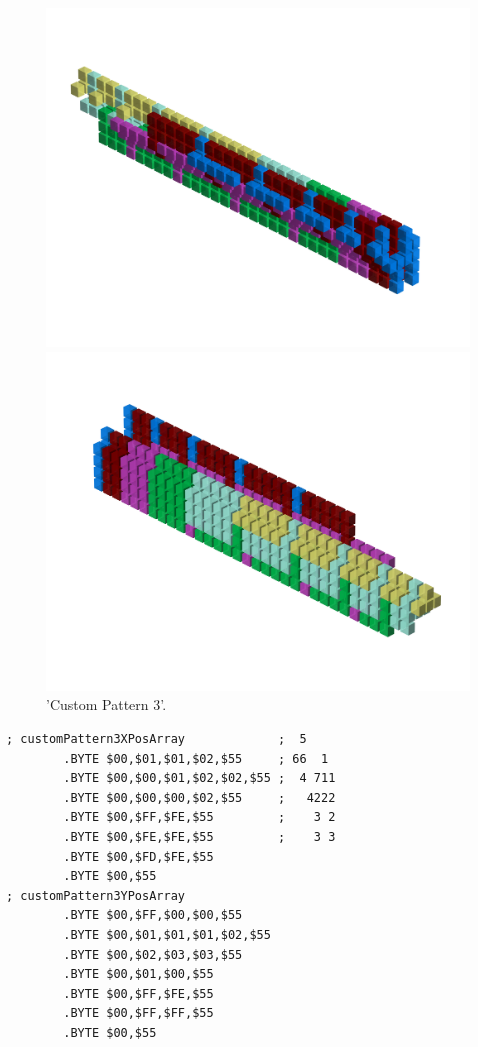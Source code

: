 \begin{figure}[H]
    \centering
    \begin{adjustbox}{width=12cm,center}
      \includegraphics[width=12cm]{src/patterns/pattern11-45.png}%
    \end{adjustbox}
    \begin{adjustbox}{width=12cm,margin=0cm -4cm}
      \includegraphics[width=12cm]{src/patterns/pattern11-225.png}%
    \end{adjustbox}
\caption{'Custom Pattern 3'.}
\end{figure}
\clearpage

\begin{lstlisting}
; customPattern3XPosArray             ;  5    
        .BYTE $00,$01,$01,$02,$55     ; 66  1 
        .BYTE $00,$00,$01,$02,$02,$55 ;  4 711
        .BYTE $00,$00,$00,$02,$55     ;   4222
        .BYTE $00,$FF,$FE,$55         ;    3 2
        .BYTE $00,$FE,$FE,$55         ;    3 3
        .BYTE $00,$FD,$FE,$55
        .BYTE $00,$55
; customPattern3YPosArray
        .BYTE $00,$FF,$00,$00,$55
        .BYTE $00,$01,$01,$01,$02,$55
        .BYTE $00,$02,$03,$03,$55
        .BYTE $00,$01,$00,$55
        .BYTE $00,$FF,$FE,$55
        .BYTE $00,$FF,$FF,$55
        .BYTE $00,$55
\end{lstlisting}


